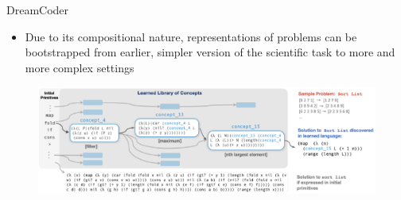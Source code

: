 \documentclass[AERbeamer%
              ,optEnglish%
              ,optBiber%
              ,optBibstyleAlphabetic%
              ,optBeamerClassicFormat%
              ]{AERlatex}%
\begin{document}
\begin{frame}[c]{DreamCoder}
    \centering
    \begin{itemize}
        \item Due to its compositional nature, representations of problems can be bootstrapped from earlier, simpler version of
              the scientific task to more and more complex settings
    \end{itemize}
    \vspace{1cm}
    \begin{figure}
        \centering
        \includegraphics[width=\textwidth]{DreamCoderCompositionality.png}
    \end{figure}
\end{frame} 
\end{document}
